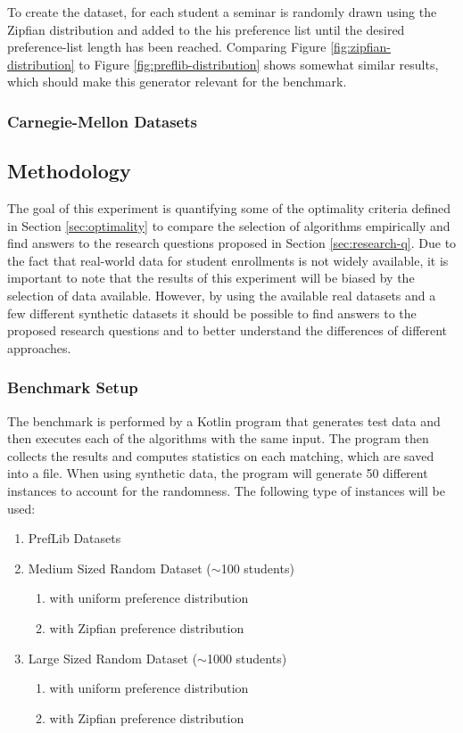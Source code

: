 To create the dataset, for each student a seminar is randomly drawn using the Zipfian distribution and added to the his preference list until the desired preference-list length has been reached. Comparing Figure \ref{fig:zipfian-distribution} to Figure \ref{fig:preflib-distribution} shows somewhat similar results, which should make this generator relevant for the benchmark. 

\subsubsection{Carnegie-Mellon Datasets}

\subsection{Methodology}
The goal of this experiment is quantifying some of the optimality criteria defined in Section \ref{sec:optimality} to compare the selection of algorithms empirically and find answers to the research questions proposed in Section \ref{sec:research-q}. Due to the fact that real-world data for student enrollments is not widely available, it is important to note that the results of this experiment will be biased by the selection of data available. However, by using the available real datasets and a few different synthetic datasets it should be possible to find answers to the proposed research questions and to better understand the differences of different approaches.

\subsubsection{Benchmark Setup}
The benchmark is performed by a Kotlin program that generates test data and then executes each of the algorithms with the same input. The program then collects the results and computes statistics on each matching, which are saved into a file. When using synthetic data, the program will generate 50 different instances to account for the randomness. The following type of instances will be used:
\begin{enumerate}
  \item PrefLib Datasets
  \item Medium Sized Random Dataset ($\sim$100 students)
  \begin{enumerate}
    \item with uniform preference distribution
    \item with Zipfian preference distribution
  \end{enumerate}
  \item Large Sized Random Dataset ($\sim$1000 students)
  \begin{enumerate}
    \item with uniform preference distribution
    \item with Zipfian preference distribution
  \end{enumerate}
\end{enumerate}

